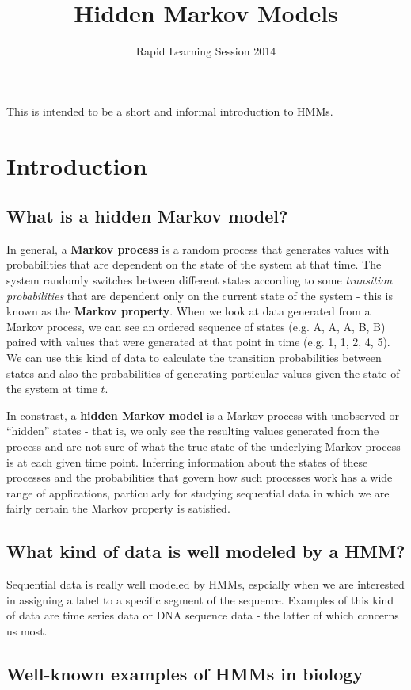 \documentclass[11pt, oneside]{article}
\title{Hidden Markov Models}
\author{Rapid Learning Session 2014}
\date{}
\begin{document}
\maketitle

This is intended to be a short and informal introduction to HMMs.

\section{Introduction}
\subsection{What is a hidden Markov model?}
In general, a \textbf{Markov process} is a random process that generates values with probabilities that are dependent on the state of the system at that time. The system randomly switches between different states according to some \textit{transition probabilities} that are dependent only on the current state of the system - this is known as the \textbf{Markov property}. When we look at data generated from a Markov process, we can see an ordered sequence of states (e.g. A, A, A, B, B) paired with values that were generated at that point in time (e.g. 1, 1, 2, 4, 5). We can use this kind of data to calculate the transition probabilities between states and also the probabilities of generating particular values given the state of the system at time $t$.

In constrast, a \textbf{hidden Markov model} is a Markov process with unobserved or ``hidden'' states - that is, we only see the resulting values generated from the process and are not sure of what the true state of the underlying Markov process is at each given time point. Inferring information about the states of these processes and the probabilities that govern how such processes work has a wide range of applications, particularly for studying sequential data in which we are fairly certain the Markov property is satisfied.

\subsection{What kind of data is well modeled by a HMM?}
Sequential data is really well modeled by HMMs, espcially when we are interested in assigning a label to a specific segment of the sequence. Examples of this kind of data are time series data or DNA sequence data - the latter of which concerns us most. 

\subsection{Well-known examples of HMMs in biology}
\end{document}
